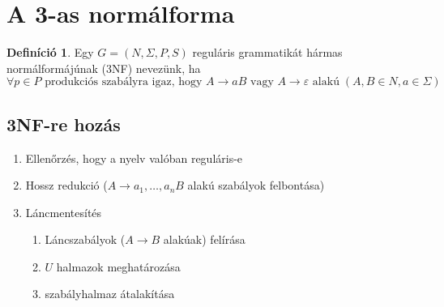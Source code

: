 \documentclass[a4paper,12pt]{article}
\theoremstyle{definition}
\newtheorem*{definition*}{Definíció}
\begin{document}
	\section{A 3-as normálforma}
	\begin{definition*}
		Egy $ G = (N, \Sigma, P, S) $ reguláris grammatikát hármas normálformájúnak (3NF) nevezünk, ha
		\[
		\forall p \in P \text{ produkciós szabályra igaz, hogy } A \rightarrow aB \text{ vagy } A \rightarrow \varepsilon \text{ alakú} \; \left( A,B \in N, a \in \Sigma \right) 
		\]
	\end{definition*}
	\subsection{3NF-re hozás}
	\begin{enumerate}
		\item Ellenőrzés, hogy a nyelv valóban reguláris-e
		\item Hossz redukció ($ A \rightarrow a_1,\dots,a_nB $ alakú szabályok felbontása)
		\item Láncmentesítés
		\begin{enumerate}
			\item Láncszabályok ($ A \rightarrow B $ alakúak) felírása
			\item $U$ halmazok meghatározása
			\item szabályhalmaz átalakítása
		\end{enumerate}
	\end{enumerate}
\end{document}
